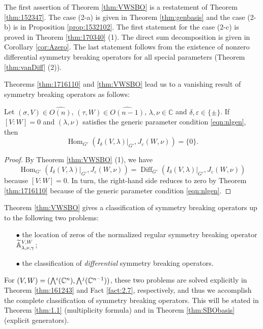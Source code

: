 The first assertion of Theorem \ref{thm:VWSBO}
 is a restatement of Theorem \ref{thm:152347}.  
The case (2-a) is given in Theorem \ref{thm:genbasis}
 and the case (2-b) is in Proposition \ref{prop:1532102}. 
The first statement 
 for the case (2-c) is proved in Theorem \ref{thm:170340} (1).  
The direct sum decomposition is given in Corollary \ref{cor:Azero}.  
The last statement follows from the existence 
 of nonzero differential symmetry breaking operators
 for all special parameters
 (Theorem \ref{thm:vanDiff} (2)).  



Theorems \ref{thm:1716110} and \ref{thm:VWSBO} lead us to a vanishing result
 of symmetry breaking operators
 as follows:  

\begin{corollary}
\label{cor:VWvanish}
Let $(\sigma, V) \in \widehat{O(n)}$, 
 $(\tau, W) \in \widehat{O(n-1)}$, 
 $\lambda, \nu \in {\mathbb{C}}$
 and $\delta, \varepsilon \in \{\pm\}$.  
If $[V:W]=0$ and 
 $(\lambda, \nu)$ satisfies 
 the generic parameter condition \eqref{eqn:nlgen}, 
 then 
\[
   {\operatorname{Hom}}_{G'}
   (I_{\delta}(V,\lambda)|_{G'}, J_{\varepsilon}(W,\nu))
   =\{0\}.  
\]
\end{corollary}

\begin{proof}
By Theorem \ref{thm:VWSBO} (1), 
 we have
\[
   {\operatorname{Hom}}_{G'}
   (I_{\delta}(V,\lambda)|_{G'}, J_{\varepsilon}(W,\nu))
   ={\operatorname{Diff}}_{G'}
    (I_{\delta}(V,\lambda)|_{G'}, J_{\varepsilon}(W,\nu))
\]
because $[V:W]=0$.  
In turn, 
 the right-hand side reduces to zero 
 by Theorem \ref{thm:1716110}
 because of the generic parameter condition \eqref{eqn:nlgen}.  
\end{proof}

Theorem \ref{thm:VWSBO} gives a classification 
 of symmetry breaking operators
 up to the following two problems:
\begin{enumerate}
\item[$\bullet$]
the location of zeros of the normalized
 regular symmetry breaking operator
 ${\widetilde{\mathbb{A}}}_{{\lambda},{\nu},{\gamma}}^{{V,W}}$;
\item[$\bullet$]
the classification of {\it{differential}} symmetry breaking operators.  
\end{enumerate}



For $(V,W)=(\Exterior^i({\mathbb{C}}^n), \Exterior^j({\mathbb{C}}^{n-1}))$, 
 these two problems are solved explicitly
 in Theorem \ref{thm:161243} and Fact \ref{fact:2.7}, 
 respectively, 
 and thus we accomplish the complete classification
 of symmetry breaking operators.  
This will be stated
 in Theorem \ref{thm:1.1} (multiplicity formula)
 and in Theorem \ref{thm:SBObasis} (explicit generators).  



